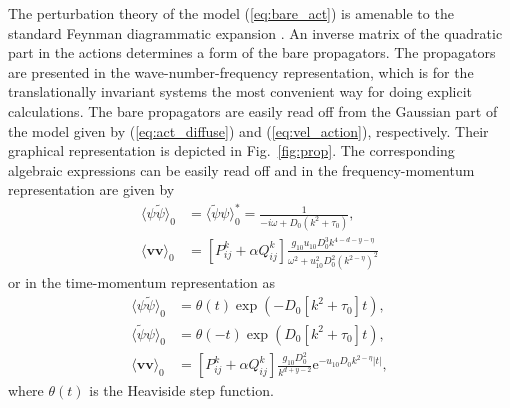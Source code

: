 \documentclass[aps,pre,url,twocolumn,superscriptaddress]{revtex4-1}
\def\mv{{\bm v}}
\def\eRM{{\mathrm e}}
\def\mk{{\bm k}}
\begin{document}
The perturbation theory of the model (\ref{eq:bare_act}) is amenable
to the standard Feynman diagrammatic expansion \cite{Amit,Zinn,Vasiliev}.
An inverse matrix of the quadratic part in the actions determines a form of the bare propagators.
 The propagators are presented in the wave-number-frequency representation, which is
for the translationally invariant systems the most convenient way for doing explicit calculations.
The bare propagators are easily read off from the Gaussian part of the model
given by (\ref{eq:act_diffuse}) and (\ref{eq:vel_action}), respectively. 
Their graphical representation
is depicted in Fig.~\ref{fig:prop}. The corresponding algebraic expressions 
can be easily read off and in the frequency-momentum representation are
given by
\begin{align}
   \langle {\psi} \tilde{\psi}\rangle_0 %
   & = 
    \langle \tilde{\psi} \psi\rangle_0^* %
    =
   \frac{1}{-i\omega + D_0(k^2+\tau_0)}, \label{eq:prop1a} \\
   \langle \mv \mv \rangle_0 %
   & =  %
   [P_{ij}^{k} + \alpha Q_{ij}^{k}]
   \frac{g_{10} u_{10} D_0^3 k^{4-d-y-\eta}}{\omega^2 + u_{10}^2 D_0^2 (k^{2-\eta})^2}
   \label{eq:prop2a}
\end{align}
or in the time-momentum representation as
 \begin{align}  
    \langle {\psi} \tilde{\psi}\rangle_0 %
   & = \theta(t) \exp(-D_0[k^2+\tau_0]t), 
   \\
    \langle \tilde{\psi} \psi\rangle_0 %
    & = \theta(-t) %
    \exp(D_0[k^2+\tau_0]t), \label{eq:prop1b} \\
   \langle \mv \mv \rangle_0  %
   & =  %
   [P_{ij}^{k} + \alpha Q_{ij}^{k}]
   \frac{g_{10}D_0^2 }{k^{d+y-2}}\eRM^{-u_{10}D_0 k^{2-\eta}|t|},
   \label{eq:prop2b}
\end{align}
where $\theta(t)$ is the Heaviside step function.
\end{document}
